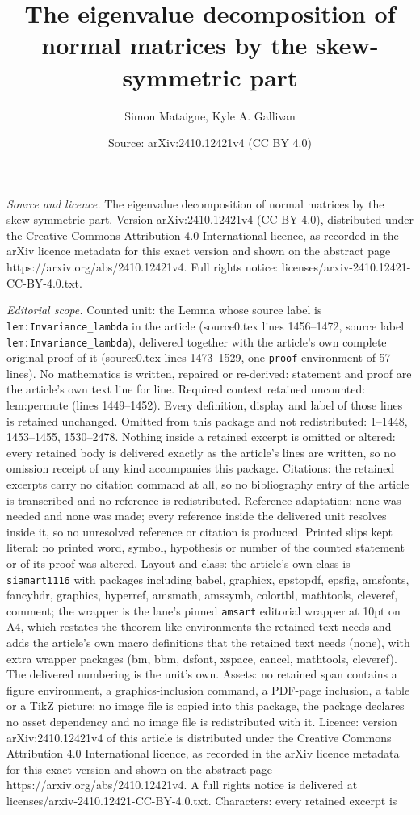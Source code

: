 \documentclass[10pt,a4paper]{amsart}
\title[The eigenvalue decomposition of normal matrices by the skew-]{The eigenvalue decomposition of normal matrices by the skew-symmetric part}
\author{Simon Mataigne, Kyle A. Gallivan}
\date{Source: arXiv:2410.12421v4 (CC BY 4.0)}
\begin{document}
\maketitle

\noindent\emph{Source and licence.} The eigenvalue decomposition of normal matrices by the skew-symmetric part. Version arXiv:2410.12421v4 (CC BY 4.0), distributed under the Creative Commons Attribution 4.0 International licence, as recorded in the arXiv licence metadata for this exact version and shown on the abstract page https://arxiv.org/abs/2410.12421v4. Full rights notice: licenses/arxiv-2410.12421-CC-BY-4.0.txt.\par\smallskip

\noindent\textit{Editorial scope.} Counted unit: the Lemma whose source label is \texttt{lem:Invariance\_lambda} in the article (source0.tex lines 1456--1472, source label \texttt{lem:Invariance\_lambda}), delivered together with the article's own complete original proof of it (source0.tex lines 1473--1529, one \texttt{proof} environment of 57 lines). No mathematics is written, repaired or re-derived: statement and proof are the article's own text line for line. Required context retained uncounted: lem:permute (lines 1449--1452). Every definition, display and label of those lines is retained unchanged. Omitted from this package and not redistributed: 1--1448, 1453--1455, 1530--2478. Nothing inside a retained excerpt is omitted or altered: every retained body is delivered exactly as the article's lines are written, so no omission receipt of any kind accompanies this package. Citations: the retained excerpts carry no citation command at all, so no bibliography entry of the article is transcribed and no reference is redistributed. Reference adaptation: none was needed and none was made; every reference inside the delivered unit resolves inside it, so no unresolved reference or citation is produced. Printed slips kept literal: no printed word, symbol, hypothesis or number of the counted statement or of its proof was altered. Layout and class: the article's own class is \texttt{siamart1116} with packages including babel, graphicx, epstopdf, epsfig, amsfonts, fancyhdr, graphics, hyperref, amsmath, amssymb, colortbl, mathtools, cleveref, comment; the wrapper is the lane's pinned \texttt{amsart} editorial wrapper at 10pt on A4, which restates the theorem-like environments the retained text needs and adds the article's own macro definitions that the retained text needs (none), with extra wrapper packages (bm, bbm, dsfont, xspace, cancel, mathtools, cleveref). The delivered numbering is the unit's own. Assets: no retained span contains a figure environment, a graphics-inclusion command, a PDF-page inclusion, a table or a TikZ picture; no image file is copied into this package, the package declares no asset dependency and no image file is redistributed with it. Licence: version arXiv:2410.12421v4 of this article is distributed under the Creative Commons Attribution 4.0 International licence, as recorded in the arXiv licence metadata for this exact version and shown on the abstract page https://arxiv.org/abs/2410.12421v4. A full rights notice is delivered at licenses/arxiv-2410.12421-CC-BY-4.0.txt. Characters: every retained excerpt is 
\end{document}
